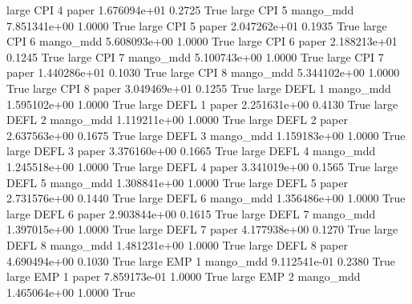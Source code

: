      large      CPI                 4                 paper 1.676094e+01      0.2725    True
     large      CPI                 5             mango_mdd 7.851341e+00      1.0000    True
     large      CPI                 5                 paper 2.047262e+01      0.1935    True
     large      CPI                 6             mango_mdd 5.608093e+00      1.0000    True
     large      CPI                 6                 paper 2.188213e+01      0.1245    True
     large      CPI                 7             mango_mdd 5.100743e+00      1.0000    True
     large      CPI                 7                 paper 1.440286e+01      0.1030    True
     large      CPI                 8             mango_mdd 5.344102e+00      1.0000    True
     large      CPI                 8                 paper 3.049469e+01      0.1255    True
     large     DEFL                 1             mango_mdd 1.595102e+00      1.0000    True
     large     DEFL                 1                 paper 2.251631e+00      0.4130    True
     large     DEFL                 2             mango_mdd 1.119211e+00      1.0000    True
     large     DEFL                 2                 paper 2.637563e+00      0.1675    True
     large     DEFL                 3             mango_mdd 1.159183e+00      1.0000    True
     large     DEFL                 3                 paper 3.376160e+00      0.1665    True
     large     DEFL                 4             mango_mdd 1.245518e+00      1.0000    True
     large     DEFL                 4                 paper 3.341019e+00      0.1565    True
     large     DEFL                 5             mango_mdd 1.308841e+00      1.0000    True
     large     DEFL                 5                 paper 2.731576e+00      0.1440    True
     large     DEFL                 6             mango_mdd 1.356486e+00      1.0000    True
     large     DEFL                 6                 paper 2.903844e+00      0.1615    True
     large     DEFL                 7             mango_mdd 1.397015e+00      1.0000    True
     large     DEFL                 7                 paper 4.177938e+00      0.1270    True
     large     DEFL                 8             mango_mdd 1.481231e+00      1.0000    True
     large     DEFL                 8                 paper 4.690494e+00      0.1030    True
     large      EMP                 1             mango_mdd 9.112541e-01      0.2380    True
     large      EMP                 1                 paper 7.859173e-01      1.0000    True
     large      EMP                 2             mango_mdd 1.465064e+00      1.0000    True
